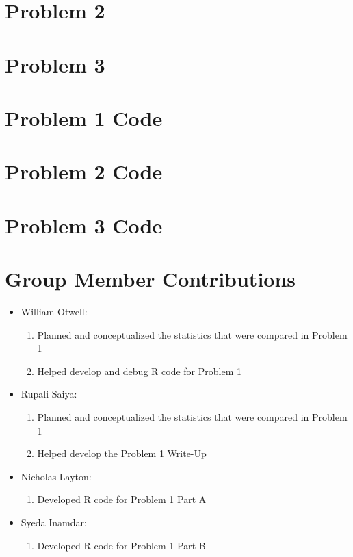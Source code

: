 \documentclass[11pt]{article}
\begin{document}
\pagebreak



\section{Problem 2}
\pagebreak

\section{Problem 3}
\pagebreak

\appendix
\section{Problem 1 Code}

\pagebreak

\section{Problem 2 Code}

\pagebreak

\section{Problem 3 Code}

\pagebreak

\section{Group Member Contributions}
\begin{itemize}
	\item William Otwell:
	\begin{enumerate}
		\item Planned and conceptualized the statistics that were compared in Problem 1
		\item Helped develop and debug R code for Problem 1
	\end{enumerate}
	
	\item Rupali Saiya:
	\begin{enumerate}
		\item Planned and conceptualized the statistics that were compared in Problem 1
		\item Helped develop the Problem 1 Write-Up
	\end{enumerate}
	
	\item Nicholas Layton:
	\begin{enumerate}
		\item Developed R code for Problem 1 Part A
	\end{enumerate}
	
	\item Syeda Inamdar:
	\begin{enumerate}
		\item Developed R code for Problem 1 Part B
	\end{enumerate}
\end{itemize}
\pagebreak
\end{document}
